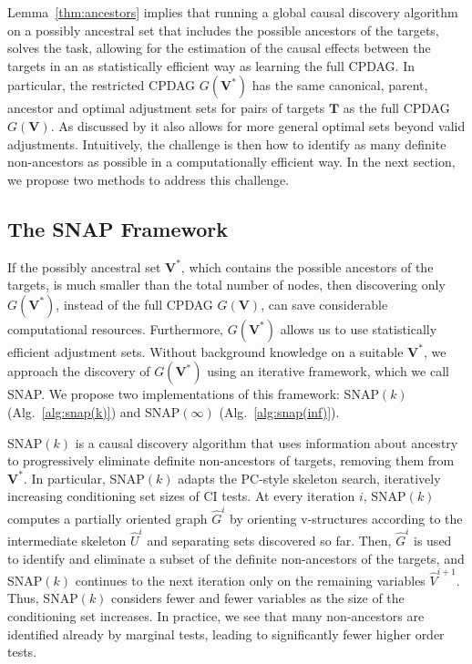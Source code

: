 Lemma~\ref{thm:ancestors} implies that running a global causal discovery algorithm on a possibly ancestral set  that includes the possible ancestors of the targets, solves the task, allowing for the estimation of the causal effects between the targets in an as  statistically efficient way as learning the full CPDAG.
In particular, the restricted \ac{CPDAG} $G(\mathbf{V}^*)$ has the same canonical, parent, ancestor and optimal adjustment sets for pairs of targets $\mathbf{T}$ as the full \ac{CPDAG} $G(\mathbf{V})$. 
As discussed by \citet{guo2023variable} it also allows for more general optimal sets beyond valid adjustments.
Intuitively, the challenge is then how to identify as many definite non-ancestors as possible in a computationally efficient way.
In the next section, we propose two methods to address this challenge.

\subsection{The SNAP Framework}
\label{sec:snap}

If the possibly ancestral set $\mathbf{V}^*$, which contains the possible ancestors of the targets, is much smaller than the total number of nodes, then discovering only $G(\mathbf{V}^*)$, instead of the full CPDAG $G(\mathbf{V})$, can save considerable computational resources.
Furthermore, $G(\mathbf{V}^*)$ allows us to use statistically efficient adjustment sets.
Without background knowledge on a suitable $\mathbf{V}^*$, we approach the discovery of $G(\mathbf{V}^*)$ using an iterative framework, which we call \acl{SNAP}. We propose two implementations of this framework: SNAP$(k)$ (Alg.~\ref{alg:snap(k)}) and SNAP$(\infty)$ (Alg.~\ref{alg:snap(inf)}).

SNAP$(k)$ is a causal discovery algorithm that uses information about ancestry to progressively eliminate definite non-ancestors of targets, removing them from $\mathbf{V}^*$.
In particular, SNAP$(k)$ adapts the PC-style skeleton search, iteratively increasing conditioning set sizes of \ac{CI} tests.
At every iteration $i$, SNAP$(k)$ computes a partially oriented graph $\hat{G}^i$ by orienting v-structures according to the intermediate skeleton $\hat{U}^i$ and separating sets discovered so far.
Then, $\hat{G}^i$ is used to identify and eliminate a subset of the definite non-ancestors of the targets, and SNAP$(k)$ continues to the next iteration only on the remaining variables $\hat{V}^{i+1}$.
Thus, SNAP$(k)$ considers fewer and fewer variables as the size of the conditioning set increases.
In practice, we see that many non-ancestors are identified already by marginal tests, leading to significantly fewer higher order tests.

